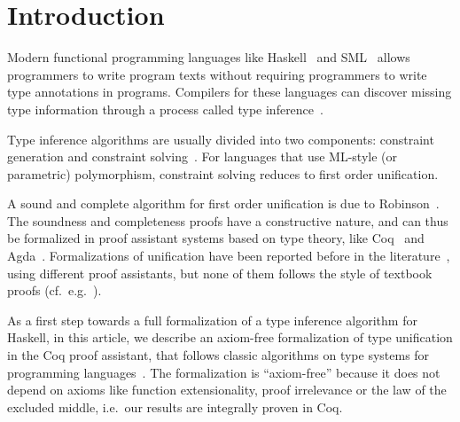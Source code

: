 \section{Introduction}

Modern functional programming languages like Haskell~
and SML~ allows programmers to write program texts
without requiring programmers to write type annotations in
programs. Compilers for these languages can discover missing type
information through a process called type inference~.

Type inference algorithms are usually divided into two components:
constraint generation and constraint solving~. For
languages that use ML-style (or parametric) polymorphism, constraint
solving reduces to first order unification.

A sound and complete algorithm for first order unification is due to
Robinson~.  The soundness and completeness proofs
have a constructive nature, and can thus be formalized in proof
assistant systems based on type theory, like Coq~ and
Agda~. Formalizations of unification have been reported
before in the literature~,
using different proof assistants, but none of them follows the style
of textbook proofs (cf.~e.g.~).

As a first step towards a full formalization of a type inference
algorithm for Haskell, in this article, we describe
an axiom-free formalization of type unification in the Coq proof
assistant, that follows classic algorithms on type systems for
programming languages~.  The formalization
is ``axiom-free'' because it does not depend on axioms like function
extensionality, proof irrelevance or the law of the excluded middle,
i.e.~our results are integrally proven in Coq.

